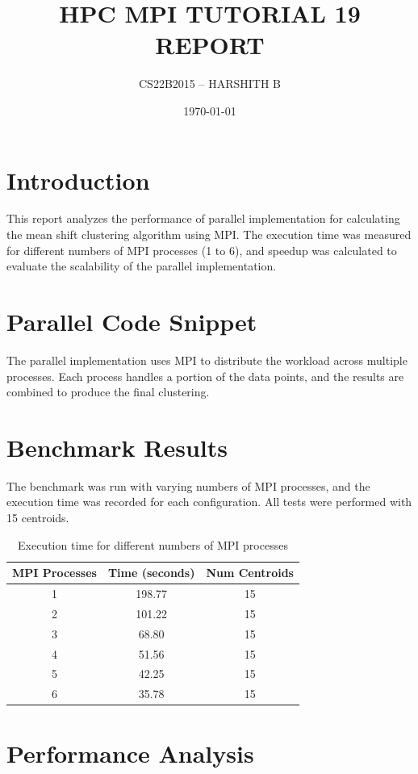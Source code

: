 \documentclass{article}
\title{HPC MPI TUTORIAL 19 REPORT}
\author{CS22B2015 -- HARSHITH B}
\date{\today}
\begin{document}
\maketitle

\section{Introduction}
This report analyzes the performance of parallel implementation for calculating the mean shift clustering algorithm using MPI. The execution time was measured for different numbers of MPI processes (1 to 6), and speedup was calculated to evaluate the scalability of the parallel implementation.

\section{Parallel Code Snippet}
The parallel implementation uses MPI to distribute the workload across multiple processes. Each process handles a portion of the data points, and the results are combined to produce the final clustering.

\section{Benchmark Results}
The benchmark was run with varying numbers of MPI processes, and the execution time was recorded for each configuration. All tests were performed with 15 centroids.

\begin{table}[H]
\centering
\begin{tabular}{|c|c|c|}
\hline
\textbf{MPI Processes} & \textbf{Time (seconds)} & \textbf{Num Centroids} \\
\hline
1 & 198.77 & 15 \\
2 & 101.22 & 15 \\
3 & 68.80 & 15 \\
4 & 51.56 & 15 \\
5 & 42.25 & 15 \\
6 & 35.78 & 15 \\
\hline
\end{tabular}
\caption{Execution time for different numbers of MPI processes}
\end{table}

\section{Performance Analysis}
\end{document}
